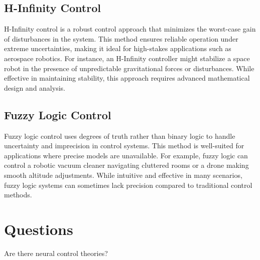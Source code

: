 \subsection{H-Infinity Control}
H-Infinity control is a robust control approach that minimizes the worst-case gain of disturbances in the system. This method ensures reliable operation under extreme uncertainties, making it ideal for high-stakes applications such as aerospace robotics. For instance, an H-Infinity controller might stabilize a space robot in the presence of unpredictable gravitational forces or disturbances. While effective in maintaining stability, this approach requires advanced mathematical design and analysis.

\subsection{Fuzzy Logic Control}
Fuzzy logic control uses degrees of truth rather than binary logic to handle uncertainty and imprecision in control systems. This method is well-suited for applications where precise models are unavailable. For example, fuzzy logic can control a robotic vacuum cleaner navigating cluttered rooms or a drone making smooth altitude adjustments. While intuitive and effective in many scenarios, fuzzy logic systems can sometimes lack precision compared to traditional control methods.

\section{Questions}

Are there neural control theories?